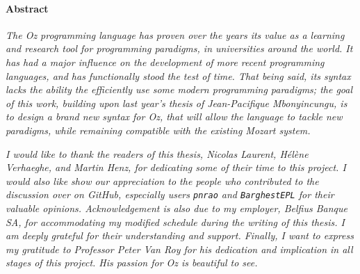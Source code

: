 
\paragraph{Abstract}
\textit{
The \textit{Oz} programming language has proven over the years its value as a learning and research tool for programming paradigms, in universities around the world.
It has had a major influence on the development of more recent programming languages, and has functionally stood the test of time.
That being said, its syntax lacks the ability the efficiently use some modern programming paradigms;
the goal of this work, building upon last year's thesis of Jean-Pacifique Mbonyincungu, is to design a brand new syntax for \textit{Oz}, that will allow the language to tackle new paradigms, while remaining compatible with the existing Mozart system.
}\newline\newline

\textit{
I would like to thank the readers of this thesis, Nicolas Laurent, Hélène Verhaeghe, and Martin Henz, for dedicating some of their time to this project.\newline
I would also like show our appreciation to the people who contributed to the discussion over on \emph{GitHub}, especially users \texttt{pnrao} and \texttt{BarghestEPL} for their valuable opinions.\newline
Acknowledgement is also due to my employer, \emph{Belfius Banque SA}, for accommodating my modified schedule during the writing of this thesis. I am deeply grateful for their understanding and support.\newline
Finally, I want to express my gratitude to Professor Peter Van Roy for his dedication and implication in all stages of this project. His passion for \emph{Oz} is beautiful to see.
}